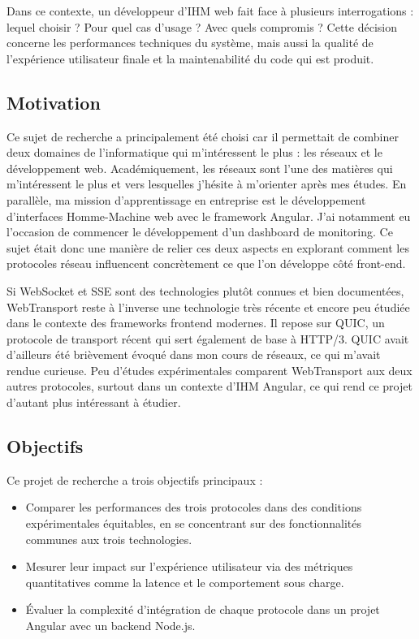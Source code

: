 Dans ce contexte, un développeur d'IHM web fait face à plusieurs interrogations : lequel choisir ? Pour quel cas d'usage ? Avec quels compromis ? Cette décision concerne les performances techniques du système, mais aussi la qualité de l'expérience utilisateur finale et la maintenabilité du code qui est produit.

\subsection{Motivation}

Ce sujet de recherche a principalement été choisi car il permettait de combiner deux domaines de l'informatique qui m'intéressent le plus : les réseaux et le développement web. Académiquement, les réseaux sont l'une des matières qui m'intéressent le plus et vers lesquelles j'hésite à m'orienter après mes études. En parallèle, ma mission d'apprentissage en entreprise est le développement d'interfaces Homme-Machine web avec le framework Angular. J'ai notamment eu l'occasion de commencer le développement d'un dashboard de monitoring. Ce sujet était donc une manière de relier ces deux aspects en explorant comment les protocoles réseau influencent concrètement ce que l'on développe côté front-end.

Si WebSocket et SSE sont des technologies plutôt connues et bien documentées, WebTransport reste à l'inverse une technologie très récente et encore peu étudiée dans le contexte des frameworks frontend modernes. Il repose sur QUIC, un protocole de transport récent qui sert également de base à HTTP/3. QUIC avait d'ailleurs été brièvement évoqué dans mon cours de réseaux, ce qui m'avait rendue curieuse. Peu d'études expérimentales comparent WebTransport aux deux autres protocoles, surtout dans un contexte d'IHM Angular, ce qui rend ce projet d'autant plus intéressant à étudier.

\subsection{Objectifs}

Ce projet de recherche a trois objectifs principaux :

\begin{itemize}
    \item Comparer les performances des trois protocoles dans des conditions expérimentales équitables, en se concentrant sur des fonctionnalités communes aux trois technologies.
    \item Mesurer leur impact sur l'expérience utilisateur via des métriques quantitatives comme la latence et le comportement sous charge.
    \item Évaluer la complexité d'intégration de chaque protocole dans un projet Angular avec un backend Node.js.
\end{itemize}

